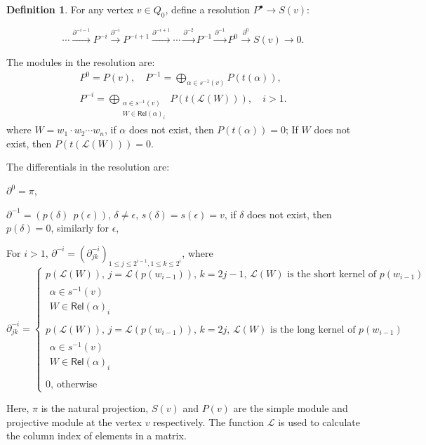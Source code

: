 \documentclass[11pt]{amsart}
\numberwithin{equation}{section}
\theoremstyle{definition}
\newtheorem{definition}[theorem]{Definition}
\begin{document}
\begin{definition}
	For any vertex \( v \in Q_0 \), define a resolution \( P^\bullet \to S(v) \):
	
	\begin{equation} \label{equ:proj}
		\cdots \xrightarrow{\partial^{-i - 1}} P^{-i} \xrightarrow{\partial^{-i}} P^{-i + 1} \xrightarrow{\partial^{-i + 1}} \cdots \xrightarrow{\partial^{-2}} P^{-1} \xrightarrow{\partial^{-1}} P^0 \xrightarrow{\partial^0} S(v) \to 0  \tag{$\divideontimes$}.
	\end{equation}
	

	The modules in the resolution are:
\begin{gather*}
	P^0 = P(v), \quad P^{-1} = \bigoplus_{\alpha \in s^{-1}(v)} P(t(\alpha)), \\
	P^{-i} = \bigoplus_{\substack{\alpha \in s^{-1}(v) \\ W \in \mathsf{Rel}(\alpha)_i}} P(t(\mathscr{L}(W))), \quad i > 1.
\end{gather*}
	where \( W = w_1 \cdot w_2 \cdots w_n \), if \( \alpha \) does not exist, then \( P(t(\alpha)) = 0 \); If \( W \) does not exist, then \( P(t(\mathscr{L}(W))) = 0 \).
	
	The differentials in the resolution are:
	
	$\partial^0 = \pi$,
	 
	$\partial^{-1} = (p(\delta)~~p(\epsilon))$, $\delta \neq \epsilon$, $s(\delta) = s(\epsilon) = v$, if  $\delta$  does not exist, then  $p(\delta) = 0$, similarly for  $\epsilon$,
	
	For \( i > 1 \), \( \partial^{-i} = (\partial^{-i}_{jk})_{1 \leq j \leq 2^{i - 1}, 1 \leq k \leq 2^i} \), where
	\[
	\partial^{-i}_{jk} =
	\begin{cases}
		p(\mathscr{L}(W)), \, j = \mathcal{L}(p(w_{i - 1})), \, k = 2j - 1, \, \mathscr{L}(W) \text{ is the short kernel of } p(w_{i - 1}) \\
		\substack{\alpha \in s^{-1}(v) \\ W \in \mathsf{Rel}(\alpha)_i} \\ \\
		p(\mathscr{L}(W)), \, j = \mathcal{L}(p(w_{i - 1})), \, k = 2j, \, \mathscr{L}(W) \text{ is the long kernel of } p(w_{i - 1}) \\
		\substack{\alpha \in s^{-1}(v) \\ W \in \mathsf{Rel}(\alpha)_i} \\  \\
		0, \, \text{otherwise}
	\end{cases}
	\]
	
	Here, \( \pi \) is the natural projection, \( S(v) \) and \( P(v) \) are the simple module and projective module at the vertex \( v \) respectively. The function $\mathcal{L}$ is used to calculate the column index of elements in a matrix.
\end{definition}
\end{document}
